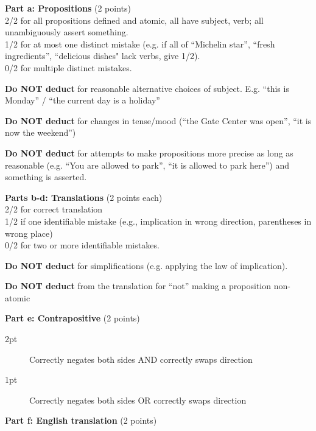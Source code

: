 \documentclass[homework, problems]{../../latex-common/cs151-common}
\begin{document}
\begin{rubric}
    \textbf{Part a: Propositions} (2 points)\\
    2/2 for all propositions defined and atomic, all have subject, verb; all unambiguously assert something.\\
    1/2 for at most one distinct mistake (e.g. if all of ``Michelin star'', ``fresh ingredients'', ``delicious dishes" lack verbs, give 1/2). \\
    0/2 for multiple distinct mistakes.

    \textbf{Do NOT deduct} for reasonable alternative choices of subject. E.g. ``this is Monday'' / ``the current day is a holiday''
    
    \textbf{Do NOT deduct} for changes in tense/mood (``the Gate Center was open'', ``it is now the weekend'')
    
    \textbf{Do NOT deduct} for attempts to make propositions more precise as long as reasonable (e.g. ``You are allowed to park'', ``it is allowed to park here'') and something is asserted.
    
    \textbf{Parts b-d: Translations} (2 points each)\\
    2/2 for correct translation \\
    1/2 if one identifiable mistake (e.g., implication in wrong direction, parentheses in wrong place)\\
    0/2 for two or more identifiable mistakes.
    
    
    \textbf{Do NOT deduct} for simplifications (e.g. applying the law of implication). 

    \textbf{Do NOT deduct} from the translation for ``not'' making a proposition non-atomic 

    \textbf{Part e: Contrapositive} (2 points)
    \begin{description}
        \item[2pt] Correctly negates both sides AND correctly swaps direction
        \item[1pt] Correctly negates both sides OR correctly swaps direction
    \end{description}

    \textbf{Part f: English translation} (2 points)
\end{rubric}
\end{document}

